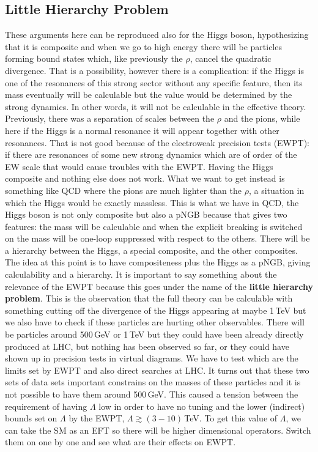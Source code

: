 \documentclass[../main.tex]{subfiles}
\begin{document}
\subsection{Little Hierarchy Problem}
These arguments here can be reproduced also for the Higgs boson, hypothesizing that it is composite and when we go to high energy there will be particles forming bound states which, like previously the $\rho$, cancel the quadratic divergence. That is a possibility, however there is a complication: if the Higgs is one of the resonances of this strong sector without any specific feature, then its mass eventually will be calculable but the value would be determined by the strong dynamics. In other words, it will not be calculable in the effective theory. Previously, there was a separation of scales between the $\rho$ and the pions, while here if the Higgs is a normal resonance it will appear together with other resonances. That is not good because of the electroweak precision tests (EWPT): if there are resonances of some new strong dynamics which are of order of the EW scale that would cause troubles with the EWPT. Having the Higgs composite and nothing else does not work. What we want to get instead is something like QCD where the pions are much lighter than the $\rho$, a situation in which the Higgs would be exactly massless. This is what we have in QCD, the Higgs boson is not only composite but also a pNGB because that gives two features: the mass will be calculable and when the explicit breaking is switched on the mass will be one-loop suppressed with respect to the others. There will be a hierarchy between the Higgs, a special composite, and the other composites. The idea at this point is to have compositeness plus the Higgs as a pNGB, giving calculability and a hierarchy. It is important to say something about the relevance of the EWPT because this goes under the name of the \textbf{little hierarchy problem}. This is the observation that the full theory can be calculable with something cutting off the divergence of the Higgs appearing at maybe 1\,TeV but we also have to check if these particles are hurting other observables. There will be particles around 500\,GeV or 1\,TeV but they could have been already directly produced at LHC, but nothing has been observed so far, or they could have shown up in precision tests in virtual diagrams. We have to test which are the limits set by EWPT and also direct searches at LHC. It turns out that these two sets of data sets important constrains on the masses of these particles and it is not possible to have them around 500\,GeV. This caused a tension between the requirement of having $\Lambda$ low in order to have no tuning and the lower (indirect) bounds set on $\Lambda$ by the EWPT, $\Lambda\gtrsim(3-10)$\,TeV. To get this value of $\Lambda$, we can take the SM as an EFT so there will be higher dimensional operators. Switch them on one by one and see what are their effects on EWPT. 
\end{document}
